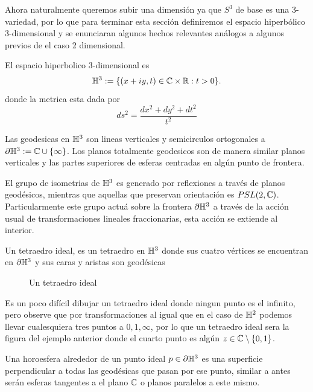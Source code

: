     Ahora naturalmente queremos subir una dimensión ya que $S^3$ de base es una 3-variedad, por lo que para terminar esta sección definiremos el espacio hiperbólico 3-dimensional y se enunciaran algunos hechos relevantes análogos a algunos previos de el caso 2 dimensional.

    \begin{definition}
        El espacio hiperbolico 3-dimensional es
        $$\mathbb{H}^3:=\{(x+iy,t)\in\mathbb{C}\times \mathbb{R}:t>0\}.$$
        donde la metrica esta dada por
        $$ds^2=\frac{dx^2+dy^2+dt^2}{t^2}$$
    \end{definition}

    \begin{theorem}
    Las geodesicas en $\mathbb{H}^3$ son lineas verticales y semicirculos ortogonales a $\partial\mathbb{H}^3:=\mathbb{C}\cup\{\infty\}$. Los planos totalmente geodesicos son de manera similar planos verticales y las partes superiores de esferas centradas en algún punto de frontera.
    \end{theorem}
    \begin{theorem}
        El grupo de isometrias de $\mathbb{H}^3$ es generado por reflexiones a través de planos geodésicos, mientras que aquellas que preservan orientación es $PSL(2,\mathbb{C})$. Particularmente este grupo actuá sobre la frontera $\partial\mathbb{H}^3$ a través de la acción usual de transformaciones lineales fraccionarias, esta acción se extiende al interior.
    \end{theorem}
    \begin{definition}
        Un tetraedro ideal, es un tetraedro en $\mathbb{H}^3$ donde sus cuatro vértices se encuentran en $\partial\mathbb{H}^3$ y sus caras y aristas son geodésicas
    \end{definition}
  \begin{figure}[H]
        \centering
        
            \caption{Un tetraedro ideal}
        \end{figure}
    \begin{note}
Es un poco difícil dibujar un tetraedro ideal donde ningun punto es el infinito, pero observe que por transformaciones al igual que en el caso de $\mathbb{H}^2$ podemos llevar cualesquiera tres puntos a $0,1,\infty$, por lo que un tetraedro ideal sera la figura del ejemplo anterior donde el cuarto punto es algún $z\in\mathbb{C}\setminus\{0,1\}$. 
\end{note}
\begin{definition}
    Una horoesfera alrededor de un punto ideal $p\in\partial\mathbb{H}^3$ es una superficie perpendicular a todas las geodésicas que pasan por ese punto, similar a antes serán esferas tangentes a el plano $\mathbb{C}$ o planos paralelos a este mismo.
\end{definition}







